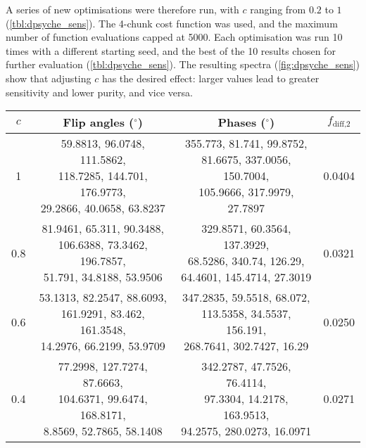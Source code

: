 A series of new optimisations were therefore run, with $c$ ranging from $0.2$ to $1$ (\cref{tbl:dpsyche_sens}).
The 4-chunk cost function was used, and the maximum number of function evaluations capped at 5000.
Each optimisation was run 10 times with a different starting seed, and the best of the 10 results chosen for further evaluation (\cref{tbl:dpsyche_sens}).
The resulting spectra (\cref{fig:dpsyche_sens}) show that adjusting $c$ has the desired effect: larger values lead to greater sensitivity and lower purity, and vice versa.

\begin{table}[htb]
    \begin{tabular}{cccc}
        \toprule
        $c$ & \textbf{Flip angles} ($^\circ$) & \textbf{Phases} ($^\circ$) & $f_\text{diff,2}$ \\
        \midrule
        1 & \makecell{59.8813, 96.0748, 111.5862, \\ 118.7285, 144.701, 176.9773, \\ 29.2866, 40.0658, 63.8237} & \makecell{355.773, 81.741, 99.8752, \\ 81.6675, 337.0056, 150.7004, \\ 105.9666, 317.9979, 27.7897} & 0.0404 \\
        \midrule
        0.8 & \makecell{81.9461, 65.311, 90.3488, \\ 106.6388, 73.3462, 196.7857, \\ 51.791, 34.8188, 53.9506} & \makecell{329.8571, 60.3564, 137.3929, \\ 68.5286, 340.74, 126.29, \\ 64.4601, 145.4714, 27.3019} & 0.0321 \\
        \midrule
        0.6 & \makecell{53.1313, 82.2547, 88.6093, \\ 161.9291, 83.462, 161.3548, \\ 14.2976, 66.2199, 53.9709} & \makecell{347.2835, 59.5518, 68.072, \\ 113.5358, 34.5537, 156.191, \\ 268.7641, 302.7427, 16.29} & 0.0250 \\
        \midrule
        0.4 & \makecell{77.2998, 127.7274, 87.6663, \\ 104.6371, 99.6474, 168.8171, \\ 8.8569, 52.7865, 58.1408} & \makecell{342.2787, 47.7526, 76.4114, \\ 97.3304, 14.2178, 163.9513, \\ 94.2575, 280.0273, 16.0971} & 0.0271 \\

\end{tabular}
\end{table}

